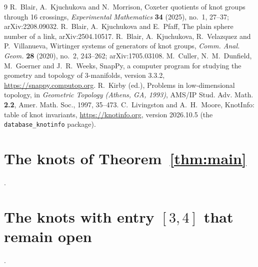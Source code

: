 \documentclass[11pt]{amsart}
\theoremstyle{definition}
\theoremstyle{remark}
\begin{document}
\begin{thebibliography}{9}
 R.~Blair, A.~Kjuchukova and N.~Morrison, Coxeter quotients of knot groups
through 16 crossings, \emph{Experimental Mathematics} \textbf{34} (2025), no.~1, 27--37;
arXiv:2208.09032.
 R.~Blair, A.~Kjuchukova and E.~Pfaff, The plain sphere number of a link,
arXiv:2504.10517.
 R.~Blair, A.~Kjuchukova, R.~Velazquez and P.~Villanueva, Wirtinger
systems of generators of knot groups, \emph{Comm. Anal. Geom.} \textbf{28} (2020), no.~2,
243--262; arXiv:1705.03108.
 M.~Culler, N.~M.~Dunfield, M.~Goerner and J.~R.~Weeks, SnapPy, a computer
program for studying the geometry and topology of 3-manifolds, version 3.3.2,
\url{https://snappy.computop.org}.
 R.~Kirby (ed.), Problems in low-dimensional topology, in \emph{Geometric
Topology (Athens, GA, 1993)}, AMS/IP Stud. Adv. Math. \textbf{2.2}, Amer. Math. Soc.,
1997, 35--473.
 C.~Livingston and A.~H.~Moore, KnotInfo: table of knot invariants,
\url{https://knotinfo.org}, version 2026.10.5 (the \texttt{database\_knotinfo} package).
\end{thebibliography}

\appendix
\section{The knots of Theorem~\ref{thm:main}}\label{app:closed}
{\small\raggedright
\closedlist.\par}

\section{The knots with entry \texorpdfstring{$[3,4]$}{[3,4]} that remain open}\label{app:open}
{\small\raggedright
\openlist.\par}
\end{document}
